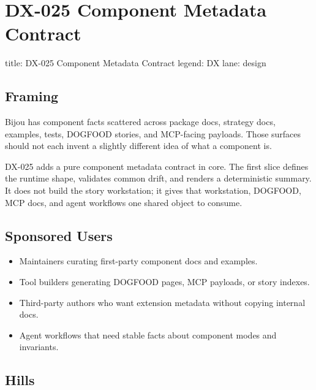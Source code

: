 \chapter{DX-025 Component Metadata Contract}\label{record-125}

\smallskip

\begin{RecordMeta}
title: DX-025 Component Metadata Contract
legend: DX
lane: design

\end{RecordMeta}

\section{Framing}\label{record-125-framing}

Bijou has component facts scattered across package docs, strategy docs, examples, tests, DOGFOOD stories, and MCP-facing payloads. Those surfaces should not each invent a slightly different idea of what a component is.

DX-025 adds a pure component metadata contract in core. The first slice defines the runtime shape, validates common drift, and renders a deterministic summary. It does not build the story workstation; it gives that workstation, DOGFOOD, MCP docs, and agent workflows one shared object to consume.

\section{Sponsored Users}\label{record-125-sponsored-users}

\begin{itemize}
\tightlist
\item
  Maintainers curating first-party component docs and examples.
\item
  Tool builders generating DOGFOOD pages, MCP payloads, or story indexes.
\item
  Third-party authors who want extension metadata without copying internal docs.
\item
  Agent workflows that need stable facts about component modes and invariants.
\end{itemize}

\section{Hills}\label{record-125-hills}

